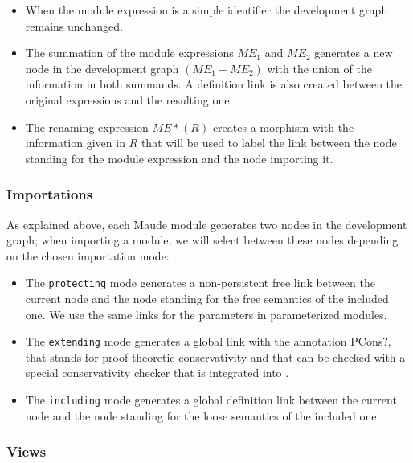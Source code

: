\begin{itemize}

\item
When the module expression is a simple identifier the development
graph remains unchanged.

\item
The summation of the module expressions $\mathit{ME}_1$ and
$\mathit{ME}_2$ generates a new node in the development graph
$(\mathit{ME}_1 + \mathit{ME}_2)$ with
the union of the information in both summands. A definition link
is also created between the original expressions and the resulting one.

\item
The renaming expression $\mathit{ME} * (R)$ creates a morphism with
the information given in $R$ that will be used to label the link between
the node standing for the module expression and the node importing it.

\end{itemize}

\subsubsection{Importations}

As explained above, each Maude module generates two nodes in the development
graph;
when importing a module, we will select between these nodes depending on the
chosen importation mode:
\begin{itemize}

\item
The \verb"protecting" mode generates a non-persistent free link between
the current node and the node standing for the free semantics of the
included one. We use the same links for the parameters in
parameterized modules.

\item
The \verb"extending" mode generates a global link with the annotation
\textsf{PCons?}, that stands for proof-theoretic conservativity and that
can be checked with a special conservativity checker that is
integrated into \Hets.

\item
The \verb"including" mode generates a global definition link between the
current node  and the node standing for the loose semantics of the
included one.
\end{itemize}

\subsubsection{Views}\label{subsec:dg_views}

